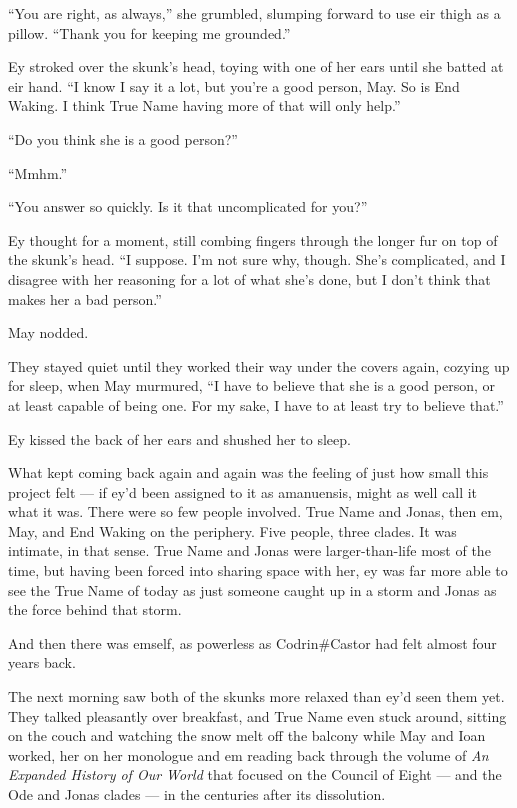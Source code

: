 ``You are right, as always,'' she grumbled, slumping forward to use eir thigh as a pillow. ``Thank you for keeping me grounded.''

Ey stroked over the skunk's head, toying with one of her ears until she batted at eir hand. ``I know I say it a lot, but you're a good person, May. So is End Waking. I think True Name having more of that will only help.''

``Do you think she is a good person?''

``Mmhm.''

``You answer so quickly. Is it that uncomplicated for you?''

Ey thought for a moment, still combing fingers through the longer fur on top of the skunk's head. ``I suppose. I'm not sure why, though. She's complicated, and I disagree with her reasoning for a lot of what she's done, but I don't think that makes her a bad person.''

May nodded.

They stayed quiet until they worked their way under the covers again, cozying up for sleep, when May murmured, ``I have to believe that she is a good person, or at least capable of being one. For my sake, I have to at least try to believe that.''

Ey kissed the back of her ears and shushed her to sleep.

What kept coming back again and again was the feeling of just how small this project felt — if ey'd been assigned to it as amanuensis, might as well call it what it was. There were so few people involved. True Name and Jonas, then em, May, and End Waking on the periphery. Five people, three clades. It was intimate, in that sense. True Name and Jonas were larger-than-life most of the time, but having been forced into sharing space with her, ey was far more able to see the True Name of today as just someone caught up in a storm and Jonas as the force behind that storm.

And then there was emself, as powerless as Codrin\#Castor had felt almost four years back.

The next morning saw both of the skunks more relaxed than ey'd seen them yet. They talked pleasantly over breakfast, and True Name even stuck around, sitting on the couch and watching the snow melt off the balcony while May and Ioan worked, her on her monologue and em reading back through the volume of \emph{An Expanded History of Our World} that focused on the Council of Eight — and the Ode and Jonas clades — in the centuries after its dissolution.

